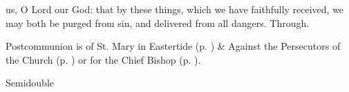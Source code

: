\postcommunion
{} us, O Lord our God: that by these things, which we have faithfully received, we may both be purged from sin, and delivered from all dangers. Through.
\begin{rubric}
     Postcommunion is of St. Mary in Eastertide (p. \pageref{SPMaryInEaster}) \&  Against the Persecutors of the Church (p. \pageref{SPAgainst}) or for the Chief Bishop (p. \pageref{SPChiefBishop}).
\end{rubric}

\begin{inhead}
    {Semidouble}
\end{inhead}

\properantiphonfix

